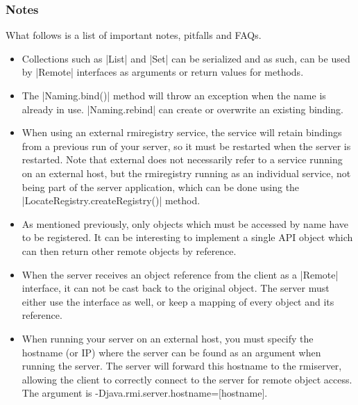 \documentclass[a4paper]{article}
\begin{document}
\subsubsection{Notes}

What follows is a list of important notes, pitfalls and FAQs.

\begin{itemize}
\item Collections such as |List| and |Set| can be serialized and as such, can be used by |Remote| interfaces as arguments or return values for methods.
\item The |Naming.bind()| method will throw an exception when the name is already in use. |Naming.rebind| can create or overwrite an existing binding.
\item When using an external rmiregistry service, the service will retain bindings from a previous run of your server, so it must be restarted when the server is restarted. Note that external does not necessarily refer to a service running on an external host, but the rmiregistry running as an individual service, not being part of the server application, which can be done using the |LocateRegistry.createRegistry()| method.
\item As mentioned previously, only objects which must be accessed by name have to be registered. It can be interesting to implement a single API object which can then return other remote objects by reference.
\item When the server receives an object reference from the client as a |Remote| interface, it can not be cast back to the original object. The server must either use the interface as well, or keep a mapping of every object and its reference.
\item When running your server on an external host, you must specify the hostname (or IP) where the server can be found as an argument when running the server. The server will forward this hostname to the rmiserver, allowing the client to correctly connect to the server for remote object access. The argument is {\small\ttfamily -Djava.rmi.server.hostname=[hostname]}.
\end{itemize}
\end{document}
